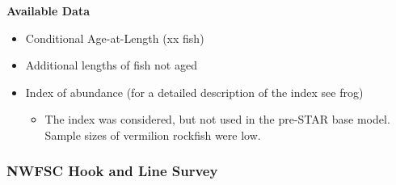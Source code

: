 \documentclass[11pt,
  english,
  a4paper,
]{article}
\begin{document}
\textbf{Available Data}


\begin{itemize}
\item

  Conditional Age-at-Length (xx fish)

  \tagmcend\tagstructend\tagstructend
\item

  Additional lengths of fish not aged

  \tagmcend\tagstructend\tagstructend
\item

  Index of abundance (for a detailed description of the index see frog)

  \tagmcend\tagstructend\tagstructend


  \begin{itemize}
  \item


    The index was considered, but not used in the pre-STAR base model. Sample sizes of vermilion rockfish were low.

    \tagmcend\tagstructend\tagstructend

    \tagmcend\tagstructend\tagstructend
  \end{itemize}

  \tagstructend
\end{itemize}

\tagstructend


\hypertarget{nwfsc-hook-and-line-survey}{%
\subsubsection{NWFSC Hook and Line Survey}\label{nwfsc-hook-and-line-survey}}

\leavevmode\tagmcend\tagstructend
\end{document}

